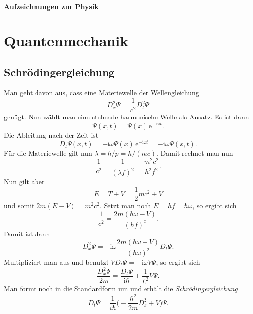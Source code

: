 \documentclass[a4paper,10pt,fleqn,twocolumn,twoside,dvipdfmx]{scrartcl}
\numberwithin{equation}{section}
\newcommand{\ui}{\mathrm i}
\newcommand{\ee}{\mathrm e}
\begin{document}
\thispagestyle{empty}

\noindent
{\LARGE\normalfont\bfseries Aufzeichnungen zur Physik}
\tableofcontents

\section{Quantenmechanik}
\subsection{Schrödingergleichung}

Man geht davon aus, dass eine Materiewelle der Wellengleichung%
\begin{equation}
D_x^2\Psi = \frac{1}{c^2}D_t^2\Psi
\end{equation}
genügt. Nun wählt man eine stehende harmonische Welle als Ansatz.
Es ist dann%
\begin{equation}
\Psi(x,t) = \Psi(x)\,\ee^{-\ui\omega t}.
\end{equation}
Die Ableitung nach der Zeit ist
\begin{equation}
D_t\Psi(x,t) = -\ui\omega\Psi(x)\,\ee^{-\ui\omega t}
= -\ui\omega\Psi(x,t).
\end{equation}
Für die Materiewelle gilt nun $\lambda=h/p=h/(mc)$. Damit rechnet
man nun%
\begin{equation}
\frac{1}{c^2} = \frac{1}{(\lambda f)^2}
= \frac{m^2 c^2}{h^2 f^2}.
\end{equation}
Nun gilt aber
\begin{equation}
E=T+V=\frac{1}{2}mc^2+V
\end{equation}
und somit $2m(E-V)=m^2 c^2$. Setzt man noch $E=hf=\hbar\omega$,
so ergibt sich%
\begin{equation}
\frac{1}{c^2} = \frac{2m(\hbar\omega-V)}{(hf)^2}.
\end{equation}
Damit ist dann
\begin{equation}
D_x^2\Psi
= -\ui\omega\frac{2m(\hbar\omega-V)}{(\hbar\omega)^2}D_t\Psi.
\end{equation}
Multipliziert man aus und benutzt $VD_t\Psi=-\ui\omega V\Psi$,
so ergibt sich%
\begin{equation}
\frac{D_x^2\Psi}{2m}
= \frac{D_t\Psi}{\ui\hbar}+\frac{1}{\hbar^2}V\Psi.
\end{equation}
Man formt noch in die Standardform um und erhält die
\emph{Schrödingergleichung}%
\begin{equation}
D_t\Psi = \frac{1}{i\hbar}\Big(-\frac{\hbar^2}{2m}D_x^2+V\Big)\Psi.
\end{equation}
\end{document}
